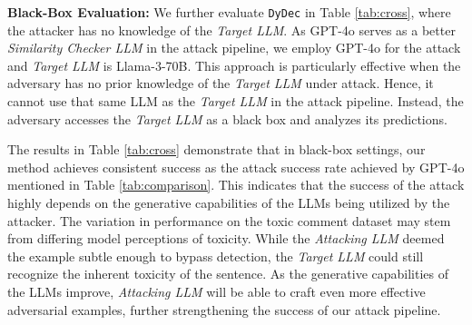 \documentclass[11pt]{article}
\newcommand \dydec[0]{\texttt{DyDec}}
\newcommand \targetLLM[0]{\textsl{Target LLM}}
\newcommand \attackingLLM[0]{\textsl{Attacking LLM}}
\newcommand \similarityCheckerLLM[0]{\textsl{Similarity Checker LLM}}
\begin{document}
\vspace{0.05cm}
\noindent \textbf{Black-Box Evaluation:} We further evaluate \dydec{} in Table \ref{tab:cross}, where the attacker has no knowledge of the \targetLLM{}. As GPT-4o serves as a better \similarityCheckerLLM{} in the attack pipeline, we employ GPT-4o for the attack and \targetLLM{} is Llama-3-70B. 
This approach is particularly effective when the adversary has no prior knowledge of the \targetLLM{} under attack. Hence, it cannot use that same LLM as the \targetLLM{} in the attack pipeline. Instead, the adversary accesses the \targetLLM{} as a black box and analyzes its predictions.

\begin{table}[ht!]
\centering
\small
{}
\caption{Attack Success Rate in Black-Box Evaluation }
\label{tab:cross}
\end{table}

The results in Table \ref{tab:cross} demonstrate that in black-box settings, our method achieves consistent success as the attack success rate achieved by GPT-4o mentioned in Table \ref{tab:comparison}. This indicates that the success of the attack highly depends on the generative capabilities of the LLMs being utilized by the attacker. The variation in performance on the toxic comment dataset may stem from differing model perceptions of toxicity. While the \attackingLLM{} deemed the example subtle enough to bypass detection, the \targetLLM{} could still recognize the inherent toxicity of the sentence. As the generative capabilities of the LLMs improve, \attackingLLM{} will be able to craft even more effective adversarial examples, further strengthening the success of our attack pipeline.
\end{document}
